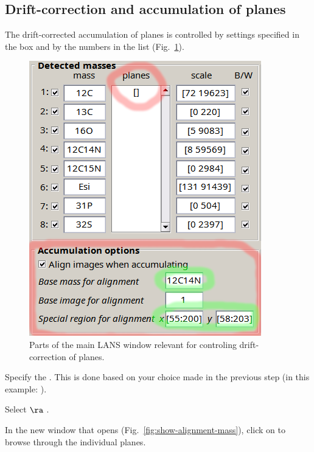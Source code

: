 
\subsection{Drift-correction and accumulation of planes}
\setcounter{step}{0}
\label{sec:drift-correction-accumulation}

The drift-corrected accumulation of planes is controlled by settings specified in the  box and by the numbers in the  list (Fig.~\ref{fig:alignoptions}). 

\begin{figure}[!ht]
\centering
\includegraphics[scale=0.4]{figs3/LANS-main-alignment}
\caption{\label{fig:alignoptions}%
Parts of the main LANS window relevant for controling drift-correction of planes.}
\end{figure}

\s Specify the . This is done based on your choice made in the previous step (in this example: ). 

\s Select  $\ra$ . 

\bul In the new window that opens (Fig.~\ref{fig:show-alignment-mass}), click on  to browse through the individual planes. 

